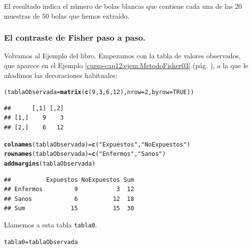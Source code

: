 \documentclass[10pt,a4paper]{article}\usepackage[]{graphicx}\usepackage[]{color}
\makeatletter
\newcommand{\hlnum}[1]{\textcolor[rgb]{0.686,0.059,0.569}{#1}}%
\newcommand{\hlstr}[1]{\textcolor[rgb]{0.192,0.494,0.8}{#1}}%
\newcommand{\hlstd}[1]{\textcolor[rgb]{0.345,0.345,0.345}{#1}}%
\newcommand{\hlkwb}[1]{\textcolor[rgb]{0.69,0.353,0.396}{#1}}%
\newcommand{\hlkwc}[1]{\textcolor[rgb]{0.333,0.667,0.333}{#1}}%
\newcommand{\hlkwd}[1]{\textcolor[rgb]{0.737,0.353,0.396}{\textbf{#1}}}%
\newenvironment{kframe}{%
 \def\at@end@of@kframe{}%
 \ifinner\ifhmode%
  \def\at@end@of@kframe{\end{minipage}}%
  \begin{minipage}{\columnwidth}%
 \fi\fi%
 \def\FrameCommand##1{\hskip\@totalleftmargin \hskip-\fboxsep
 \colorbox{shadecolor}{##1}\hskip-\fboxsep
     \hskip-\linewidth \hskip-\@totalleftmargin \hskip\columnwidth}%
 \MakeFramed {\advance\hsize-\width
   \@totalleftmargin\z@ \linewidth\hsize
   \@setminipage}}%
 {\par\unskip\endMakeFramed%
 \at@end@of@kframe}
\newenvironment{knitrout}{}{} %
\newcounter {cont01}
\makeatother
\begin{document}
El resultado indica el número de bolas blancas que contiene cada una de las $20$ muestras de $50$ bolas que hemos extraído.

\subsubsection*{El contraste de Fisher paso a paso.}

Volvamos al Ejemplo del libro. Empezamos con la tabla de valores observados, que aparece en el Ejemplo \ref{curso-cap12:ejem:MetodoFisher03} (pág. \pageref{curso-cap12:ejem:MetodoFisher03}), a la que le añadimos las decoraciones habituales:
\begin{knitrout}
\color{fgcolor}\begin{kframe}
\begin{alltt}
\hlstd{(tablaObservada} \hlkwb{=} \hlkwd{matrix}\hlstd{(} \hlkwd{c}\hlstd{(}\hlnum{9}\hlstd{,} \hlnum{3}\hlstd{,} \hlnum{6}\hlstd{,} \hlnum{12}\hlstd{),}  \hlkwc{nrow}\hlstd{=} \hlnum{2}\hlstd{,} \hlkwc{byrow} \hlstd{=} \hlnum{TRUE}\hlstd{))}
\end{alltt}
\begin{verbatim}
##      [,1] [,2]
## [1,]    9    3
## [2,]    6   12
\end{verbatim}
\begin{alltt}
\hlkwd{colnames}\hlstd{(tablaObservada)} \hlkwb{=} \hlkwd{c}\hlstd{(}\hlstr{"Expuestos"}\hlstd{,} \hlstr{"NoExpuestos"}\hlstd{)}
\hlkwd{rownames}\hlstd{(tablaObservada)} \hlkwb{=} \hlkwd{c}\hlstd{(}\hlstr{"Enfermos"}\hlstd{,} \hlstr{"Sanos"} \hlstd{)}
\hlkwd{addmargins}\hlstd{(tablaObservada)}
\end{alltt}
\begin{verbatim}
##          Expuestos NoExpuestos Sum
## Enfermos         9           3  12
## Sanos            6          12  18
## Sum             15          15  30
\end{verbatim}
\end{kframe}
\end{knitrout}
Llamemos a esta tabla {\tt tabla0}.
\begin{knitrout}
\color{fgcolor}\begin{kframe}
\begin{alltt}
\hlstd{tabla0} \hlkwb{=} \hlstd{tablaObservada}
\end{alltt}
\end{kframe}
\end{knitrout}
\end{document}
